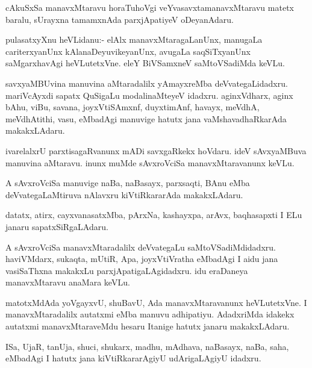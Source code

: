 \documentclass{article}
\begin{document}
\begin{mn}
cAkuSxSa manavxMtaravu horaTuhoVgi veYvasavxtamanavxMtaravu matetx
baralu, sUrayxna tamamxnAda parxjApatiyeV oDeyanAdaru.
\end{mn}

\begin{mn}%
pulasatxyXnu heVLidanu:- elAlx manavxMtaragaLanUnx, manugaLa
cariterxyanUnx kAlanaDeyuvikeyanUnx, avugaLa saqSiTxyanUnx
saMgarxhavAgi heVLutetxVne. eleY BiVSamxneV saMtoVSadiMda keVLu.
\end{mn}

\begin{mn}%
savxyaMBUvina manuvina aMtaradalilx yAmayxreMba
deVvategaLidadxru. mariVcAyxdi sapatx QuSigaLu modalinaMteyeV
idadxru. aginxVdharx, aginx bAhu, viBu, savana, joyxVtiSAmxnf,
duyxtimAnf, havayx, meVdhA, meVdhAtithi, vasu, eMbadAgi manuvige
hatutx jana vaMshavadhaRkarAda makakxLAdaru.
\end{mn}

\begin{mn}
ivarelalxrU parxtisagaRvanunx mADi savxgaRkekx hoVdaru. ideV
sAvxyaMBuva manuvina aMtaravu. inunx muMde sAvxroVciSa
manavxMtaravanunx keVLu.
\end{mn}

\begin{mn}%
A sAvxroVciSa manuvige naBa, naBasayx, parxsaqti, BAnu eMba
deVvategaLaMtiruva nAlavxru kiVtiRkararAda makakxLAdaru.
\end{mn}

\begin{mn}%
datatx, atirx, cayxvanasatxMba, pArxNa, kashayxpa, arAvx, baqhasapxti
I ELu janaru sapatxSiRgaLAdaru.
\end{mn}

\begin{mn}%
A sAvxroVciSa manavxMtaradalilx deVvategaLu
saMtoVSadiMdidadxru. haviVMdarx, sukaqta, mUtiR, Apa, joyxVtiVratha
eMbadAgi I aidu jana vasiSaThxna makakxLu parxjApatigaLAgidadxru. idu
eraDaneya manavxMtaravu anaMara keVLu.
\end{mn}

\begin{mn}
matotxMdAda yoVgayxvU, shuBavU, Ada manavxMtaravanunx heVLutetxVne. I
manavxMtaradalilx autatxmi eMba manuvu adhipatiyu. AdadxriMda idakekx
autatxmi manavxMtaraveMdu hesaru Itanige hatutx janaru makakxLAdaru.
\end{mn}

\begin{mn}
ISa, UjaR, tanUja, shuci, shukarx, madhu, mAdhava, naBasayx, naBa,
saha, eMbadAgi I hatutx jana kiVtiRkararAgiyU udArigaLAgiyU idadxru.
\end{mn}
\end{document}
